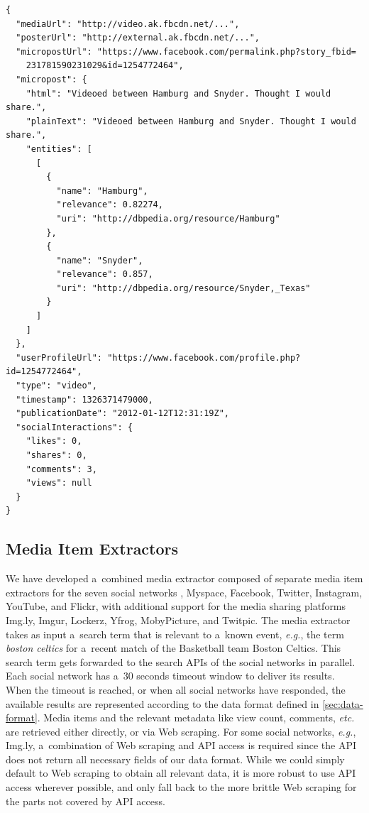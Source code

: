 \begin{lstlisting}[caption={Sample output of the media extractor
  showing a~Facebook post processed with named-entity extraction
  and disambiguation (slightly edited for legibility).},
  label={code:facebook}]
{
  "mediaUrl": "http://video.ak.fbcdn.net/...",
  "posterUrl": "http://external.ak.fbcdn.net/...",
  "micropostUrl": "https://www.facebook.com/permalink.php?story_fbid=
    231781590231029&id=1254772464",
  "micropost": {
    "html": "Videoed between Hamburg and Snyder. Thought I would share.",
    "plainText": "Videoed between Hamburg and Snyder. Thought I would share.",
    "entities": [
      [
        {
          "name": "Hamburg",
          "relevance": 0.82274,
          "uri": "http://dbpedia.org/resource/Hamburg"
        },
        {
          "name": "Snyder",
          "relevance": 0.857,
          "uri": "http://dbpedia.org/resource/Snyder,_Texas"
        }
      ]
    ]
  },
  "userProfileUrl": "https://www.facebook.com/profile.php?id=1254772464",
  "type": "video",
  "timestamp": 1326371479000,
  "publicationDate": "2012-01-12T12:31:19Z",
  "socialInteractions": {
    "likes": 0,
    "shares": 0,
    "comments": 3,
    "views": null
  }
}
\end{lstlisting}

\subsection{Media Item Extractors}
\label{sec:media-item-extractors}

We have developed a~combined media extractor composed of
separate media item extractors for the seven social networks
\googleplus, Myspace, Facebook, Twitter, Instagram, YouTube,
and Flickr, with additional support for the media sharing
platforms Img.ly, Imgur, Lockerz, Yfrog, MobyPicture, and Twitpic.
The media extractor takes as input a~search term that is relevant
to a~known event, \emph{e.g.}, the term \emph{boston celtics}
for a~recent match of the Basketball team Boston Celtics.
This search term gets forwarded to the search APIs
of the social networks in parallel.
Each social network has a~30 seconds timeout window
to deliver its results.
When the timeout is reached,
or when all social networks have responded,
the available results are represented according to the data format
defined in \autoref{sec:data-format}.
Media items and the relevant metadata like view count, comments,
\emph{etc.} are retrieved either directly, or via Web scraping.
For some social networks, \emph{e.g.}, Img.ly,
a~combination of Web scraping and API access is required
since the API does not return all necessary fields
of our data format.
While we could simply default to Web scraping
to obtain all relevant data,
it is more robust to use API access wherever possible,
and only fall back to the more brittle Web scraping
for the parts not covered by API access.

